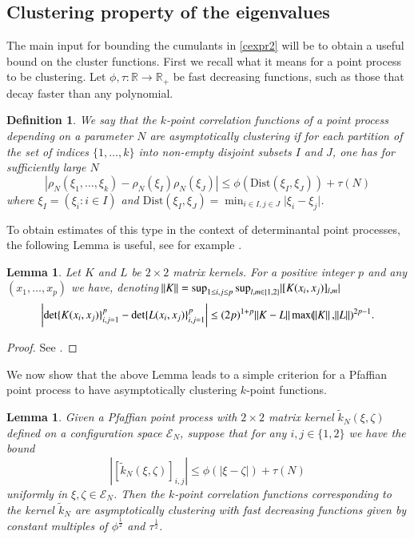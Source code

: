 \documentclass[11pt,reqno]{amsproc}
\newtheorem{lemma}[theorem]{Lemma}
\newtheorem{definition}[theorem]{Definition}
\numberwithin{equation}{section}
\numberwithin{theorem}{section}
\begin{document}
\subsection{Clustering property of the eigenvalues}
\label{se:clustering}
The main input for bounding the cumulants in \eqref{cexpr2} will be to obtain a useful bound on the cluster functions. First we recall what it means for a point process to be clustering. Let $\phi, \tau : \mathbb{R} \to \mathbb{R}_+$ be fast decreasing functions, such as those that decay faster than any polynomial.
\begin{definition}
\label{def:clustering}
We say that the $k$-point correlation functions of a point process depending on a parameter $N$ are \textit{asymptotically clustering} if for each partition of the set of indices $\{1,\ldots,k\}$ into non-empty disjoint subsets $I$ and $J$, one has for sufficiently large $N$
\begin{equation}
|\rho_{N}(\xi_1,\ldots,\xi_{k})-\rho_{N}(\xi_{I})\rho_{N}(\xi_{J})| \leq \phi(\mathrm{Dist}(\xi_{I},\xi_{J})) + \tau(N)
\end{equation}
where $\xi_{I} = (\xi_{i} : i \in I)$ and $\mathrm{Dist}(\xi_I, \xi_J) = \min_{i \in I, j \in J} \lvert \xi_i - \xi_j \rvert$.
\end{definition}
To obtain estimates of this type in the context of determinantal point processes, the following Lemma is useful, see for example \cite[Section 5.2]{BYY19}.
\begin{lemma}
\label{AGZ_lemma}
Let $K$ and $L$ be $2 \times 2$ matrix kernels. For a positive integer $p$ and any $(x_1, \ldots, x_p)$ we have,
denoting $\norm{K} = \sup_{1 \leq i,j \leq p}\sup_{l, m \in \{1, 2\}}  \lvert [K(x_i,x_j)]_{l, m} \rvert$
\begin{equation}
\bigg{|}\mathrm{det}\{K(x_i, x_j)\}_{i,j=1}^{p} - \mathrm{det}\{L(x_i, x_j)\}_{i,j=1}^{p}\bigg{|} \leq (2p)^{1+p} \norm{K-L} \max(\norm{K},  \norm{L})^{2p-1}.
\end{equation}
\end{lemma}
\begin{proof}
See \cite[Lemma 3.3]{AGZ10}.
\end{proof}
We now show that the above Lemma leads to a simple criterion for a Pfaffian point process to have asymptotically clustering $k$-point functions.
\begin{lemma}
\label{le:pfaffcriteria}
Given a Pfaffian point process with $2 \times 2$ matrix kernel $\tilde{k}_{N}(\xi,\zeta)$ defined on a configuration space $\mathcal{E}_{N}$, suppose that for any $i,j \in \{1,2\}$ we have the bound
\begin{equation}
|[\tilde{k}_{N}(\xi,\zeta)]_{i,j}| \leq \phi(|\xi-\zeta|) + \tau(N)
\end{equation}
uniformly in $\xi, \zeta \in \mathcal{E}_{N}$. Then the $k$-point correlation functions corresponding to the kernel $\tilde{k}_{N}$ are asymptotically clustering with fast decreasing functions given by constant multiples of $\phi^{\frac{1}{2}}$ and $\tau^{\frac{1}{2}}$.
\end{lemma}
\end{document}
